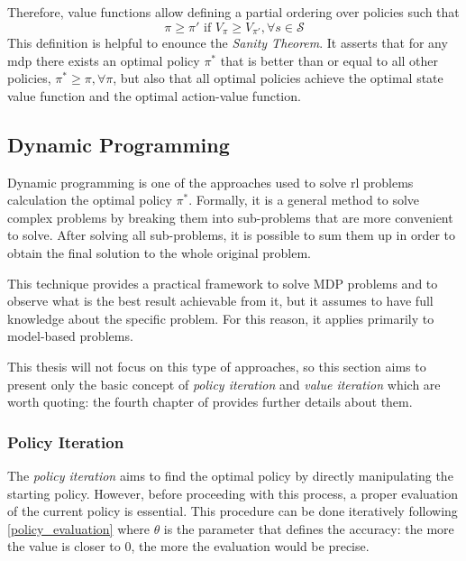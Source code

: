 Therefore, value functions allow defining a partial ordering over policies such that \[\pi \ge \pi' \text{ if } V_\pi \ge V_{\pi'},\forall s \in \mathcal{S}\]
This definition is helpful to enounce the \textit{Sanity Theorem}. It asserts that for any \acrshort{mdp} there exists an optimal policy $\pi^*$ that is better than or equal to all other policies, $\pi^* \ge \pi, \forall \pi$, but also that all optimal policies achieve the optimal state value function and the optimal action-value function.


\subsection{Dynamic Programming}

Dynamic programming is one of the approaches used to solve \acrshort{rl} problems calculation the optimal policy $\pi^*$. Formally, it is a general method to solve complex problems by breaking them into sub-problems that are more convenient to solve. After solving all sub-problems, it is possible to sum them up in order to obtain the final solution to the whole original problem.

This technique provides a practical framework to solve MDP problems and to observe what is the best result achievable from it, but it assumes to have full knowledge about the specific problem. For this reason, it applies primarily to model-based problems.

This thesis will not focus on this type of approaches, so this section aims to present only the basic concept of \textit{policy iteration} and \textit{value iteration} which are worth quoting: the fourth chapter of \cite[Chapter 4]{sutton2018reinforcement} provides further details about them.

\subsubsection{Policy Iteration}

The \textit{policy iteration} aims to find the optimal policy by directly manipulating the starting policy. However, before proceeding with this process, a proper evaluation of the current policy is essential. This procedure can be done iteratively following \vref{policy_evaluation} where $\theta$ is the parameter that defines the accuracy: the more the value is closer to $0$, the more the evaluation would be precise.

